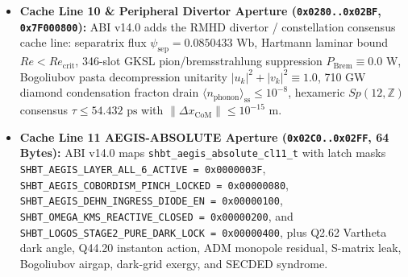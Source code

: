 \documentclass[11pt,onecolumn]{article}
\begin{document}
\begin{itemize}
nominal $120\text{ dB}$). Cache Line 8 (\texttt{0x0200..0x023F}) maps the v11 Stellar Hydrodynamics \& Loss-Cone Invariants: \texttt{wd\_instanton\_action\_measured} ($S_{\text{instanton}} \ge 250.0$), \texttt{wd\_pycnonuclear\_rate\_cm3\_s} ($R_{\text{pyc}} \le 1.0 \times 10^{-120}\text{ cm}^{-3}\text{s}^{-1}$), \texttt{m\_dwarf\_dynamo\_attenuation\_db} ($\ge 120.0\text{ dB}$), \texttt{massive\_star\_opacity\_ratio} ($\kappa_{\text{eff}} / \kappa_0 \le 1.0 \times 10^{-12}$), \texttt{nsc\_tde\_penetration\_prob} ($P_{\text{TDE}} \le 1.0 \times 10^{-120}$), \texttt{async\_symplectic\_2form\_drift} ($\|d\omega\| \le 1.0 \times 10^{-19}$), \texttt{v11\_harvested\_nucleons\_counter} ($10^{12}$ baryons), and \texttt{v11\_reserved\_tail}. Cache Line 9 (\texttt{0x0240..0x027F}) maps the v12 \texttt{SHBT-MAR-OMEGA} Continuous-Flow Reactor \& Dual-Reactor Power Bus Arbiter registers: \texttt{mar\_omega\_gross\_power\_zw} ($1.00\text{--}10.00\text{ ZW}$), \texttt{mar\_omega\_slipstream\_ratio} ($f_{\text{slip}} \in [10^{-4}, 10^{-3}]$), \texttt{mar\_omega\_sensible\_heat\_kw} ($\le 245.0\text{ kW}$ at $21.13\text{ K}$), \texttt{mar\_omega\_throat\_stress\_mpa} ($< 10^{-6}\text{ MPa}$), \texttt{stellar\_harvest\_rate\_msun\_yr} ($\ge 20.0\,M_\odot/\text{yr}$), \texttt{wd\_effective\_coulomb\_gamma} ($\Gamma_{\text{eff}} < 175.0$), \texttt{ns\_cfl\_gap\_mev\_residual} ($\Delta_{\text{eff}} \to 0.0\text{ MeV}$), \texttt{power\_bus\_arbiter\_mode} (\texttt{0x01..0x06}), and \texttt{dual\_reactor\_status\_flags}.
    \item \textbf{Cache Line 10 \& Peripheral Divertor Aperture (\texttt{0x0280..0x02BF}, \texttt{0x7F000800}):} ABI v14.0 adds the RMHD divertor / constellation consensus cache line: separatrix flux $\psi_{\mathrm{sep}} = 0.0850433\text{ Wb}$, Hartmann laminar bound $Re < Re_{\mathrm{crit}}$, 346-slot GKSL pion/bremsstrahlung suppression $P_{\mathrm{Brem}} \equiv 0.0\text{ W}$, Bogoliubov pasta decompression unitarity $|u_k|^2 + |v_k|^2 \equiv 1.0$, 710 GW diamond condensation fracton drain $\langle n_{\mathrm{phonon}}\rangle_{\mathrm{ss}} \le 10^{-8}$, hexameric $Sp(12,\mathbb{Z})$ consensus $\tau \le 54.432\text{ ps}$ with $\lVert\Delta x_{\mathrm{CoM}}\rVert \le 10^{-15}\text{ m}$.
    \item \textbf{Cache Line 11 AEGIS-ABSOLUTE Aperture (\texttt{0x02C0..0x02FF}, 64 Bytes):} ABI v14.0 maps \texttt{shbt\_aegis\_absolute\_cl11\_t} with latch masks \texttt{SHBT\_AEGIS\_LAYER\_ALL\_6\_ACTIVE = 0x0000003F}, \texttt{SHBT\_AEGIS\_COBORDISM\_PINCH\_LOCKED = 0x00000080}, \texttt{SHBT\_AEGIS\_DEHN\_INGRESS\_DIODE\_EN = 0x00000100}, \texttt{SHBT\_OMEGA\_KMS\_REACTIVE\_CLOSED = 0x00000200}, and \texttt{SHBT\_LOGOS\_STAGE2\_PURE\_DARK\_LOCK = 0x00000400}, plus Q2.62 Vartheta dark angle, Q44.20 instanton action, ADM monopole residual, S-matrix leak, Bogoliubov airgap, dark-grid exergy, and SECDED syndrome.

\end{itemize}
\end{document}
